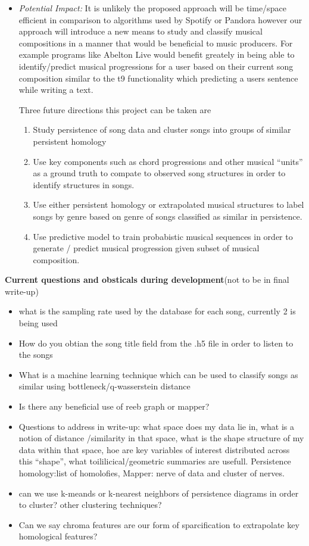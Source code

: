 \documentclass[11pt, a4paper]{article}
\begin{document}
\begin{enumerate}
\begin{itemize}
    
  \item \textit{Potential Impact:}
    It is unlikely the proposed approach will be time/space efficient in comparison to algorithms used by Spotify or Pandora however our approach will introduce a new means to study and classify musical compositions in a manner that would be beneficial to music producers. For example programs like Abelton Live would benefit greately in being able to identify/predict musical progressions for a user based on their current song composition similar to the t9 functionality which predicting a users sentence while writing a text.

    
      Three future directions this project can be taken are
      \begin{enumerate}
      \item Study persistence of song data and cluster songs into groups of similar persistent homology
      \item Use key components such as chord progressions and other musical ``units'' as a ground truth to compate to observed song structures in order to identify structures in songs.
      \item Use either persistent homology or extrapolated musical structures to label songs by genre based on genre of songs classified as similar in persistence.
      \item Use predictive model to train probabistic musical sequences in order to generate / predict musical progression given subset of musical composition.
      \end{enumerate}


  \end{itemize}
\end{enumerate}

  {\large {\bf Current questions and obsticals during development}}{\small (not to be in final write-up)}
  
  \begin{itemize}
  \item what is the sampling rate used by the database for each song, currently 2 is being used
  \item How do you obtian the song title field from the .h5 file in order to listen to the songs
  \item What is a machine learning technique which can be used to classify songs as similar using bottleneck/q-wasserstein distance
  \item Is there any beneficial use of reeb graph or mapper?
  \item Questions to address in write-up: what space does my data lie in, what is a notion of distance /similarity in that space, what is the shape structure of my data within that space, hoe are key variables of interest distributed across this ``shape'', what toililicical/geometric summaries are usefull. Persistence homology:list of homolofies, Mapper: nerve of data and cluster of nerves.
  \item can we use k-meands or k-nearest neighbors of persistence diagrams in order to cluster? other clustering techniques?
  \item Can we say chroma features are our form of sparcification to extrapolate key homological features?
  \end{itemize}
  
\end{document}
